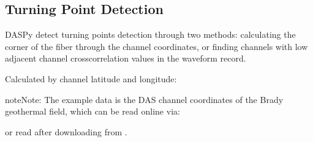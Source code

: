 \documentclass[letterpaper,10pt,english]{sphinxmanual}
\let\sphinxpxdimen\pdfpxdimen\else\newdimen\sphinxpxdimen
\begin{document}
\noindent\sphinxincludegraphics[width=500\sphinxpxdimen]{{chn_interp}.png}


\subsection{Turning Point Detection}
\label{\detokenize{Channel Analysis:turning-point-detection}}\label{\detokenize{Channel Analysis:id2}}
\sphinxAtStartPar
DASPy detect turning points detection through two methods: calculating the corner of the fiber through the channel coordinates, or finding channels with low adjacent channel cross\sphinxhyphen{}correlation values in the waveform record.

\sphinxAtStartPar
Calculated by channel latitude and longitude:

\begin{sphinxadmonition}{note}{Note:}
\sphinxAtStartPar
The example data is the DAS channel coordinates of the Brady geothermal field, which can be read online via:

\begin{sphinxVerbatim}[commandchars=\\\{\}]
   
  
     \PYG{p}{[}\PYG{p}{]}
  \PYG{p}{[}\PYG{p}{[}\PYG{p}{]}  \PYG{p}{]} 
\end{sphinxVerbatim}

\sphinxAtStartPar
or read after downloading from .
\end{sphinxadmonition}
\end{document}

